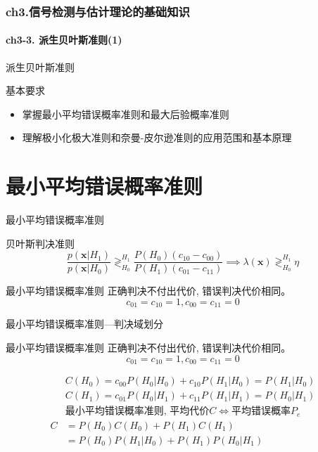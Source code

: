 \begin{frame}[shrink]
  \frametitle{ch3.信号检测与估计理论的基础知识}
  \framesubtitle{ch3-3. 派生贝叶斯准则(1)}
  \tableofcontents[hideallsubsections]
\end{frame}

\begin{frame}{派生贝叶斯准则}
\begin{block}{基本要求}
	\begin{itemize} 
		\item 掌握最小平均错误概率准则和最大后验概率准则
		\item 理解极小化极大准则和奈曼-皮尔逊准则的应用范围和基本原理
	\end{itemize}
\end{block}
\end{frame}

\section{最小平均错误概率准则}

\begin{frame}{最小平均错误概率准则}
\begin{block}{贝叶斯判决准则}
	\[ \frac{p(\bm{x}|H_1)}{p(\bm{x}|H_0)}\mathop{\gtrless}_{H_0}^{H_1}\frac{P(H_0)(c_{10}-c_{00})}{P(H_1)(c_{01}-c_{11})} \implies \lambda(\bm{x})\mathop{\gtrless}_{H_0}^{H_1}\eta \]
\end{block}
\begin{block}{最小平均错误概率准则}
	正确判决不付出代价, 错误判决代价相同。
	\[c_{01}=c_{10}=1, c_{00}=c_{11}=0\]
\end{block}
\end{frame}

\begin{frame}[shrink]{最小平均错误概率准则---判决域划分}
\begin{block}{最小平均错误概率准则}
	正确判决不付出代价, 错误判决代价相同。
	\[c_{01}=c_{10}=1, c_{00}=c_{11}=0\]
\end{block}
\begin{align*}
&C(H_0)=c_{00}P(H_0|H_0)+c_{10}P(H_1|H_0)=P(H_1|H_0)\\
&C(H_1)=c_{01}P(H_0|H_1)+c_{11}P(H_1|H_1)=P(H_0|H_1)\\
&\textbf{最小平均错误概率准则, 平均代价$C$}\Leftrightarrow\textbf{平均错误概率$P_e$}\\
C&=P(H_0)C(H_0)+P(H_1)C(H_1)\\
&=P(H_0)P(H_1|H_0)+P(H_1)P(H_0|H_1)
\end{align*}
\end{frame}

